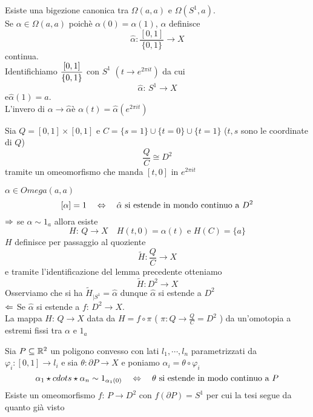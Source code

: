 Esiste una bigezione canonica tra $\Omega(a,a)$ e $ \Omega(S^1, a)$.\\
Se $\alpha\in\Omega(a,a)$ poich\`e $\alpha(0)=\alpha(1)$, $\alpha$ definisce 
$$ \hat{\alpha}: \frac{[0,1]}{\{0,1\}} \to X $$ 
continua.\\
Identifichiamo $\displaystyle \frac{[0,1]}{\{ 0, 1\}}$ con $S^1 $ $\left(  t \to e^{2\pi i t }\right)$ da cui 
$$ \hat{\alpha}:\, S^1 \to X$$ 
e$\hat{\alpha}(1)=a$.\\
L'invero di $ \alpha \to \hat{\alpha}$\`e  $ \alpha(t) =\hat{\alpha}\left( e^{2\pi i t } \right)$
\spazio
\begin{lem}Sia $Q=[0,1]\times [0,1]$ e $C=\{ s=1\} \cup \{ t=0\} \cup \{ t=1\}$ ($t,s$ sono le coordinate di $Q$) 
$$ \frac{Q}{C} \cong D^2$$ 
tramite un omeomorfismo che manda $[t,0]$ in $e^{2\pi i t}$
\end{lem}
\spazio
\begin{prop}$\alpha\in Omega (a,a)$
$$ [\alpha]=1 \quad \Leftrightarrow \quad \hat{\alpha} \text{ si estende in mondo continuo a } D^2 $$
\proof $\Rightarrow$ se $\alpha\sim 1_a$ allora  esiste 
$$ H:\, Q \to X \quad H(t,0)=\alpha(t) \text{ e } H(C)=\{a \}$$
$H$ definisce per passaggio al quoziente 
$$\tilde{H}: \frac{Q}{C} \to X$$
e tramite l'identificazione del lemma precedente otteniamo 
$$ \tilde{H}: D^2 \to X $$ 
Osserviamo che si ha $\tilde{H}_{\vert S^1}=\hat{\alpha}$ dunque $\hat{\alpha}$ si estende a $D^2$\\
$\Leftarrow$ Se $\hat{\alpha}$ si estende a $f:\, D^2 \to X$.\\
La mappa $H: \, Q \to X$ data da $H = f \circ \pi $ ( $\pi:Q \to \frac{Q}{C}=D^2$ ) da un'omotopia a estremi fissi tra $\alpha$ e $1_a$
\endproof
\end{prop}
\begin{cor}Sia $P\subseteq \mathbb{R}^2$ un poligono convesso con lati $l_1, \cdots, l_n $ parametrizzati da $\varphi_i :[0,1]\to l_i$ e sia $\theta: \partial P \to X$ e poniamo $\alpha_i=\theta \circ \varphi_i$
$$ \alpha_1 \star cdots \star \alpha_n \sim 1_{\alpha_1(0)} \quad \Leftrightarrow \quad \theta \text{ si estende in modo continuo a } P $$
\proof Esiste un omeomorfismo $f:\, P\to D^2$ con $f(\partial P) = S^1$ per cui la tesi segue da quanto gi\`a visto 
\endproof
\end{cor}
